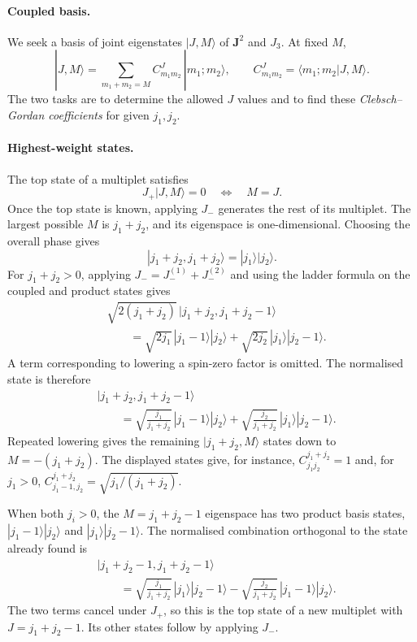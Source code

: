 \documentclass[11pt,a4paper]{article}
\begin{document}
\paragraph{Coupled basis.}
We seek a basis of joint eigenstates $|J,M\rangle$ of $\mathbf J^2$
and $J_3$. At fixed $M$,
\[
    |J,M\rangle = \sum_{m_1+m_2=M}
        C^J_{m_1m_2}\,|m_1;m_2\rangle,\qquad
    C^J_{m_1m_2} = \langle m_1;m_2|J,M\rangle.
\]
The two tasks are to determine the allowed $J$ values and to find
these \emph{Clebsch--Gordan coefficients} for given $j_1,j_2$.

\paragraph{Highest-weight states.}
The top state of a multiplet satisfies
\[
    J_+|J,M\rangle=0 \quad\Longleftrightarrow\quad M=J.
\]
Once the top state is known, applying $J_-$ generates the rest of
its multiplet. The largest possible $M$ is $j_1+j_2$, and its
eigenspace is one-dimensional. Choosing the overall phase gives
\[
    |j_1+j_2,j_1+j_2\rangle=|j_1\rangle|j_2\rangle.
\]
For $j_1+j_2>0$, applying $J_-=J_-^{(1)}+J_-^{(2)}$ and using
the ladder formula on the coupled and product states gives
\begin{align*}
    &\sqrt{2(j_1+j_2)}\,|j_1+j_2,j_1+j_2-1\rangle\\
    &\qquad = \sqrt{2j_1}\,|j_1-1\rangle|j_2\rangle
             + \sqrt{2j_2}\,|j_1\rangle|j_2-1\rangle.
\end{align*}
A term corresponding to lowering a spin-zero factor is omitted.
The normalised state is therefore
\begin{align*}
    &|j_1+j_2,j_1+j_2-1\rangle\\
    &\qquad = \sqrt{\frac{j_1}{j_1+j_2}}\,|j_1-1\rangle|j_2\rangle
             + \sqrt{\frac{j_2}{j_1+j_2}}\,|j_1\rangle|j_2-1\rangle.
\end{align*}
Repeated lowering gives the remaining $|j_1+j_2,M\rangle$ states down
to $M=-(j_1+j_2)$. The displayed states give, for instance,
$C^{j_1+j_2}_{j_1j_2}=1$ and, for $j_1>0$,
$C^{j_1+j_2}_{j_1-1,j_2}=\sqrt{j_1/(j_1+j_2)}$.

When both $j_i>0$, the $M=j_1+j_2-1$ eigenspace has two product
basis states, $|j_1-1\rangle|j_2\rangle$ and
$|j_1\rangle|j_2-1\rangle$. The normalised combination orthogonal
to the state already found is
\begin{align*}
    &|j_1+j_2-1,j_1+j_2-1\rangle\\
    &\qquad = \sqrt{\frac{j_1}{j_1+j_2}}\,|j_1\rangle|j_2-1\rangle
             - \sqrt{\frac{j_2}{j_1+j_2}}\,|j_1-1\rangle|j_2\rangle.
\end{align*}
The two terms cancel under $J_+$, so this is the top state of a
new multiplet with $J=j_1+j_2-1$. Its other states follow by
applying $J_-$.
\end{document}
